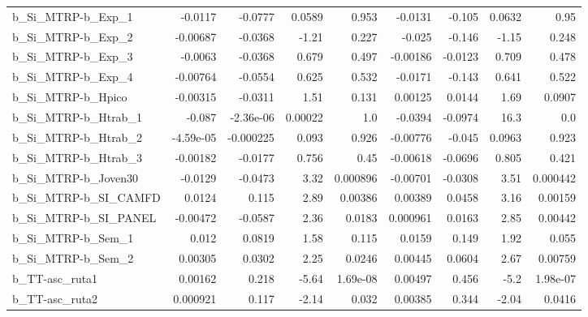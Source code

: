 \begin{tabular}{lrrrrrrrr}
b\_Si\_MTRP-b\_Exp\_1          &     -0.0117 &      -0.0777 &    0.0589 &    0.953 &    -0.0131 &      -0.105 &       0.0632 &          0.95 \\
b\_Si\_MTRP-b\_Exp\_2          &    -0.00687 &      -0.0368 &     -1.21 &    0.227 &     -0.025 &      -0.146 &        -1.15 &         0.248 \\
b\_Si\_MTRP-b\_Exp\_3          &     -0.0063 &      -0.0368 &     0.679 &    0.497 &   -0.00186 &     -0.0123 &        0.709 &         0.478 \\
b\_Si\_MTRP-b\_Exp\_4          &    -0.00764 &      -0.0554 &     0.625 &    0.532 &    -0.0171 &      -0.143 &        0.641 &         0.522 \\
b\_Si\_MTRP-b\_Hpico          &    -0.00315 &      -0.0311 &      1.51 &    0.131 &    0.00125 &      0.0144 &         1.69 &        0.0907 \\
b\_Si\_MTRP-b\_Htrab\_1        &      -0.087 &    -2.36e-06 &   0.00022 &      1.0 &    -0.0394 &     -0.0974 &         16.3 &           0.0 \\
b\_Si\_MTRP-b\_Htrab\_2        &   -4.59e-05 &    -0.000225 &     0.093 &    0.926 &   -0.00776 &      -0.045 &       0.0963 &         0.923 \\
b\_Si\_MTRP-b\_Htrab\_3        &    -0.00182 &      -0.0177 &     0.756 &     0.45 &   -0.00618 &     -0.0696 &        0.805 &         0.421 \\
b\_Si\_MTRP-b\_Joven30        &     -0.0129 &      -0.0473 &      3.32 & 0.000896 &   -0.00701 &     -0.0308 &         3.51 &      0.000442 \\
b\_Si\_MTRP-b\_SI\_CAMFD       &      0.0124 &        0.115 &      2.89 &  0.00386 &    0.00389 &      0.0458 &         3.16 &       0.00159 \\
b\_Si\_MTRP-b\_SI\_PANEL       &    -0.00472 &      -0.0587 &      2.36 &   0.0183 &   0.000961 &      0.0163 &         2.85 &       0.00442 \\
b\_Si\_MTRP-b\_Sem\_1          &       0.012 &       0.0819 &      1.58 &    0.115 &     0.0159 &       0.149 &         1.92 &         0.055 \\
b\_Si\_MTRP-b\_Sem\_2          &     0.00305 &       0.0302 &      2.25 &   0.0246 &    0.00445 &      0.0604 &         2.67 &       0.00759 \\
b\_TT-asc\_ruta1             &     0.00162 &        0.218 &     -5.64 & 1.69e-08 &    0.00497 &       0.456 &         -5.2 &      1.98e-07 \\
b\_TT-asc\_ruta2             &    0.000921 &        0.117 &     -2.14 &    0.032 &    0.00385 &       0.344 &        -2.04 &        0.0416 \\

\end{tabular}
